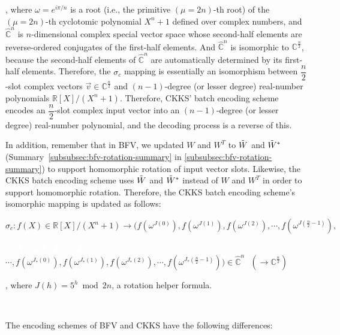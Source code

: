, where $\omega = e^{i\pi/n}$ is a root (i.e., the primitive $(\mu=2n)$-th root) of the $(\mu=2n)$-th cyclotomic polynomial $X^n + 1$ defined over complex numbers, and $\mathbb{\hat{C}}^{n}$ is $n$-dimensional complex special vector space whose second-half elements are reverse-ordered conjugates of the first-half elements. And $\mathbb{\hat{C}}^{n}$ is isomorphic to $\mathbb{{C}}^{\frac{n}{2}}$, because the second-half elements of $\mathbb{\hat{C}}^{n}$ are automatically determined by its first-half elements. Therefore, the $\sigma_c$ mapping is essentially an isomorphism between $\dfrac{n}{2}$-slot complex vectors $\vec{v} \in \mathbb{C}^{\frac{n}{2}}$ and $(n-1)$-degree (or lesser degree) real-number polynomials $\mathbb{R}[X] / (X^n + 1)$. Therefore, CKKS' batch encoding scheme encodes an $\dfrac{n}{2}$-slot complex input vector into an $(n-1)$-degree (or lesser degree) real-number polynomial, and the decoding process is a reverse of this. 

In addition, remember that in BFV, we updated $W$ and $W^T$ to $\tilde W$ and $\tilde W^*$ (Summary~\ref*{subsubsec:bfv-rotation-summary} in \autoref{subsubsec:bfv-rotation-summary}) to support homomorphic rotation of input vector slots. Likewise, the CKKS batch encoding scheme uses $\tilde W$ and $\tilde W^*$ instead of $W$ and $W^T$ in order to support homomorphic rotation. Therefore, the CKKS batch encoding scheme's isomorphic mapping is updated as follows:


$\sigma_c: f(X) \in \mathbb{R}[X]/(X^n + 1) \longrightarrow \bm ( f(\omega^{J(0)}),f(\omega^{J(1)}),f(\omega^{J(2)}), \cdots, f(\omega^{J(\frac{n}{2} - 1)}), $

\textcolor{white}{$ f(X) \in \mathbb{R}[X]/(X^n + 1) \longrightarrow \bm ( $} $\cdots, f(\omega^{J_*(0)}),f(\omega^{J_*(1)}),f(\omega^{J_*(2)}), \cdots, f(\omega^{J_*(\frac{n}{2} - 1)}) \bm) \in \mathbb{\hat{C}}^{n} \text{ } (\longrightarrow \mathbb{C}^{\frac{n}{2}})$

, where $J(h) = 5^h \bmod 2n$, a rotation helper formula.  


$ $

The encoding schemes of BFV and CKKS have the following differences: 

